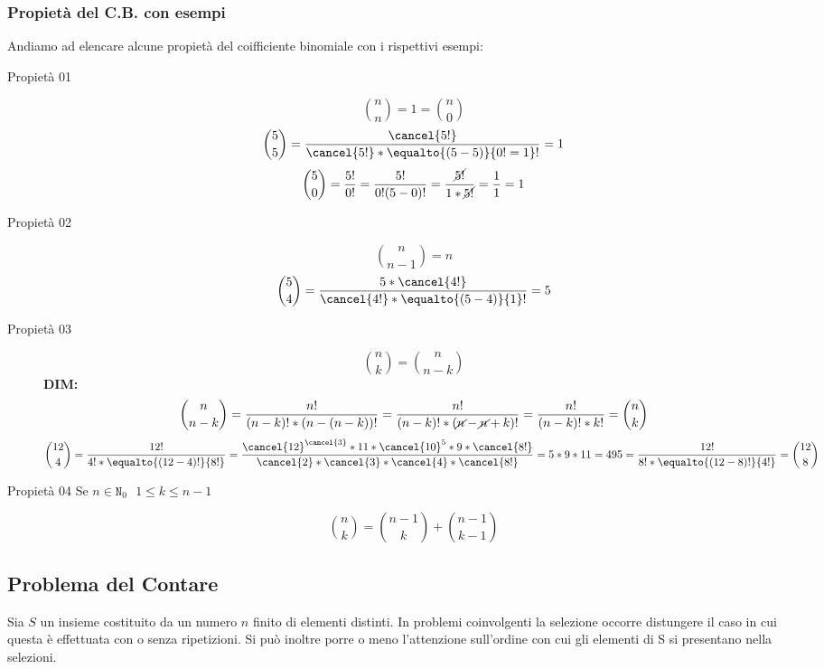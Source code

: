 \subsubsection{Propietà del C.B. con esempi}
Andiamo ad elencare alcune propietà del coifficiente binomiale con i rispettivi esempi:
\begin{description}
  \item [Propietà 01] 
  	$$ \binom{n}{n} = 1 = \binom{n}{0} $$
	$$\binom{5}{5} = \frac{\cancel{5!}}{\cancel{5!}*\equalto{(5-5)}{0!=1}!} = 1 $$ 
	$$ \binom{5}{0} = \frac{5!}{0!} = \frac{5!}{0!(5-0)!} = \frac{\cancel{5!}}{1*\cancel{5!}} = \frac{1}{1} = 1$$
	
  \item [Propietà 02] 
  	$$ \binom{n}{n-1} = n $$
	$$\binom{5}{4} = \frac{5*\cancel{4!}}{\cancel{4!}*\equalto{(5-4)}{1}!} = 5 $$ 
  \item [Propietà 03]
  $$ \binom{n}{k} = \binom{n}{n-k} $$
  \textbf{DIM:}\\
  $$ \binom{n}{n-k} = \frac{n!}{(n-k)!*(n-(n-k))!} = \frac{n!}{(n-k)!*(\cancel{n}-\cancel{n}+k)!} = \frac{n!}{(n-k)!*k!} = \binom{n}{k} $$
  $$ \binom{12}{4} = \frac{12!}{4!*\equalto{(12-4)!}{8!}} = \frac{\cancel{12}^{\cancel{3}}*11*\cancel{10}^5*9*\cancel{8!}}{\cancel{2}*\cancel{3}*\cancel{4}*\cancel{8!}} = 5*9*11 = 495 = \frac{12!}{8!*\equalto{(12-8)!}{4!}} = \binom{12}{8} $$
  \item [Propietà 04 Se $n \in \mathtt{N}_0 \: \: \: 1 \le k \le n-1 $]
  $$ \binom{n}{k} = \binom{n-1}{k} + \binom{n-1}{k-1}$$
\iffalse
  \item [Propietà 05 ($n=6, k=3$)]
  $$ \binom{n+1}{k} = \binom{n}{k} + \binom{n}{k-1}  $$
\begin{equation*}
\resizebox{\textwidth}{!}
{%
$\binom{7}{3} = \frac{7*\cancel{6}*5*\cancel{4!}}{\cancel{3!}*\cancel{4!}} = 7*5 = 35 = 20+15 =\frac{\cancel{2}*\cancel{3}*4*5*\cancel{6}}{\cancel{6} * \cancel{6}} + \frac{\cancel{6}^3*5*\cancel{4!}}{\cancel{2}*\cancel{4!}} = \frac{6!}{3!*3!} + \frac{6!}{2!*4!} = \binom{6}{3} + \binom{6}{2}$%
}
\end{equation*}
\fi
\end{description}


\subsection{Problema del Contare}
Sia $S$ un insieme costituito da un numero $n$ finito di elementi distinti. In problemi coinvolgenti la selezione occorre distungere il caso in cui questa è effettuata con o senza ripetizioni. Si può inoltre porre o meno l'attenzione sull'ordine con cui gli elementi di S si presentano nella selezioni.

